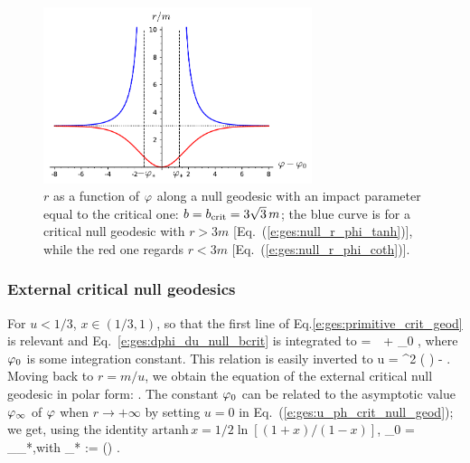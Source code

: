 \begin{figure}
\centerline{\includegraphics[width=0.7\textwidth]{ges_null_r_phi_bcrit.pdf}}
\caption[]{\label{f:gis:null_r_phi_bcrit} \footnotesize
$r$ as a function of $\varphi$ along a null geodesic with an impact parameter
equal to the critical one:
$b = b_{\rm crit} = 3\sqrt{3} \, m$; the blue curve is for a critical
null geodesic with $r>3m$
[Eq.~(\ref{e:ges:null_r_phi_tanh})], while the red one
regards $r<3m$ [Eq.~(\ref{e:ges:null_r_phi_coth})].}
\end{figure}

\subsubsection{External critical null geodesics}

For $u<1/3$, $x\in(1/3, 1)$, so that the first line of Eq.\eqref{e:ges:primitive_crit_geod}
is relevant and Eq.~\eqref{e:ges:dphi_du_null_bcrit} is integrated to
\be \label{e:ges:ph_u_crit_null_geod}
    \ph =  \,\,  + \ph_0 ,
\ee
where $\varphi_0$ is some integration constant. This relation is easily inverted
to
\be \label{e:ges:u_ph_crit_null_geod}
    u =   \tanh^2 \left( \right) -  .
\ee
Moving back to $r = m/u$, we obtain the equation of the external critical
null geodesic in polar form:
\be \label{e:ges:null_r_phi_tanh}
   .
\ee
The constant $\varphi_0$ can be related to the asymptotic value $\varphi_\infty$ of $\varphi$
when $r\to +\infty$ by setting $u=0$ in Eq.~(\ref{e:ges:u_ph_crit_null_geod});
we get, using the identity $\mathrm{artanh}\,  x = 1/2\ln[(1+x)/(1-x)]$,
\be \label{e:ges:null_ph_0_ph_inf}
    \ph_0 = \ph_\infty \pm \ph_*,\quad\mbox{with}\quad
    \ph_* := \ln\left(\right)
    .
\ee

